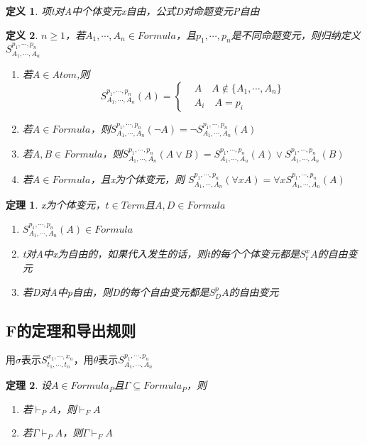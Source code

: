 \documentclass[a4paper]{ctexart}
\newtheorem{thm}{\hspace{2em}定理}[subsection]
\newtheorem{defi}{\hspace{2em}定义}[subsection]
\begin{document}
\begin{defi}
  项t对A中个体变元x自由，公式D对命题变元P自由
\end{defi}

\begin{defi}
  $ n\geq 1$，若$A_1,\cdots,A_n\in Formula$，且$p_1,\cdots,p_n$是不同命题变元，则归纳定义$S^{p_1,\cdots,p_n}_{A_1,\cdots,A_n}$
  \begin{enumerate}[itemindent=2em]
    \item 若$A\in Atom$,则 
    $$S^{p_1,\cdots,p_n}_{A_1,\cdots,A_n}(A)=\left\{
    \begin{aligned}
      &A\quad A\not\in \{A_1,\cdots,A_n\}\\
      &A_i \quad A=p_i    
    \end{aligned}\right.$$
    
    \item 若$A\in Formula$，则$S^{p_1,\cdots,p_n}_{A_1,\cdots,A_n}(\neg A)=\neg S^{p_1,\cdots,p_n}_{A_1,\cdots,A_n}(A)$
    \item 若$A,B\in Formula$，则$S^{p_1,\cdots,p_n}_{A_1,\cdots,A_n}(A\vee B)=S^{p_1,\cdots,p_n}_{A_1,\cdots,A_n}(A)\vee S^{p_1,\cdots,p_n}_{A_1,\cdots,A_n}(B)$
    \item 若$A\in Formula$，且x为个体变元，则
    $S^{p_1,\cdots,p_n}_{A_1,\cdots,A_n}(\forall{x}A)=\forall{x}S^{p_1,\cdots,p_n}_{A_1,\cdots,A_n}(A)$
  \end{enumerate}
\end{defi}

\begin{thm}
  x为个体变元，$t\in Term$且$A,D\in Formula$
  \begin{enumerate}[itemindent=2em]
    \item $S^{p_1,\cdots,p_n}_{A_1,\cdots,A_n}(A)\in Formula$
    \item t对A中x为自由的，如果代入发生的话，则t的每个个体变元都是$S_t^xA$的自由变元
    \item 若D对A中p自由，则D的每个自由变元都是$S_D^pA$的自由变元
  \end{enumerate}
\end{thm}

\subsection{F的定理和导出规则}
用$\sigma$表示$S^{x_1,\cdots,x_n}_{t_1,\cdots,t_n}$，用$\theta$表示$S^{p_1,\cdots,p_n}_{A_1,\cdots,A_n}$
\begin{thm}
  设$A\in Formula_P$且$\Gamma\subseteq Formula_P$，则
  \begin{enumerate}[itemindent=2em]
    \item 若$\vdash_PA$，则$\vdash_FA$
    \item 若$\Gamma\vdash_PA$，则$\Gamma\vdash_FA$
  \end{enumerate}
\end{thm}
\end{document}
